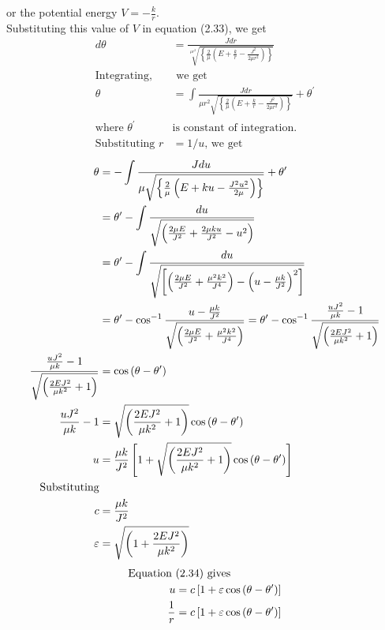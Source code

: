 or the potential energy $V=-\frac{k}{r}$.\\
Substituting this value of $V$ in equation (2.33), we get
\begin{align*}
d \theta&=\frac{J d r}{\sqrt[\mu r^{2}]{\left\{\frac{2}{\mu}\left(E+\frac{k}{r}-\frac{J^{2}}{2 \mu r^{2}}\right)\right\}}}\\
\text{Integrating,}&\text{ we get}\\
\theta&=\int \frac{J d r}{\mu r^{2} \sqrt{\left\{\frac{2}{\mu}\left(E+\frac{k}{r}-\frac{J^{2}}{2 \mu r^{2}}\right)\right\}}}+\theta^{\prime}\\
\text{where $\theta^{\prime}$ }&\text{is constant of integration.}\\
\text{Substituting }r&=1 / u\text{, we get}
\end{align*}
\begin{align}
\theta&=-\int \frac{J d u}{\mu \sqrt{\left\{\frac{2}{\mu}\left(E+k u-\frac{J^{2} u^{2}}{2 \mu}\right)\right\}}}+\theta^{\prime} \notag \\
&=\theta^{\prime}-\int \frac{d u}{\sqrt{\left(\frac{2 \mu E}{J^{2}}+\frac{2 \mu k u}{J^{2}}-u^{2}\right)}} \notag \\
&=\theta^{\prime}-\int \frac{d u}{\sqrt{\left[\left(\frac{2 \mu E}{J^{2}}+\frac{\mu^{2} k^{2}}{J^{4}}\right)-\left(u-\frac{\mu k}{J^{2}}\right)^{2}\right]}} \notag\\
&=\theta^{\prime}-\cos ^{-1} \frac{u-\frac{\mu k}{J^{2}}}{\sqrt{\left(\frac{2 \mu E}{J^{2}}+\frac{\mu^{2} k^{2}}{J^{4}}\right)}}=\theta^{\prime}-\cos ^{-1} \frac{\frac{u J^{2}}{\mu k}-1}{\sqrt{\left(\frac{2 E J^{2}}{\mu k^{2}}+1\right)}} \notag\\
\frac{\frac{u J^{2}}{\mu k}-1}{\sqrt{\left(\frac{2 E J^{2}}{\mu k^{2}}+1\right)}}&=\cos \left(\theta-\theta^{\prime}\right)\notag\\
\frac{u J^{2}}{\mu k}-1&=\sqrt{\left(\frac{2 E J^{2}}{\mu k^{2}}+1\right)} \cos \left(\theta-\theta^{\prime}\right) \notag \\
u&=\frac{\mu k}{J^{2}}\left[1+\sqrt{\left(\frac{2 E J^{2}}{\mu k^{2}}+1\right)} \cos \left(\theta-\theta^{\prime}\right)\right]\\
\text{Substituting}\\
c &=\frac{\mu k}{J^{2}} \\
\varepsilon &=\sqrt{\left(1+\frac{2 E J^{2}}{\mu k^{2}}\right)}
\end{align}
\begin{align}
\text{Equation }&\text{(2.34) gives}\\
	u &=c\left[1+\varepsilon \cos \left(\theta-\theta^{\prime}\right)\right] \notag \\
	\frac{1}{r} &=c\left[1+\varepsilon \cos \left(\theta-\theta^{\prime}\right)\right]
\end{align}
